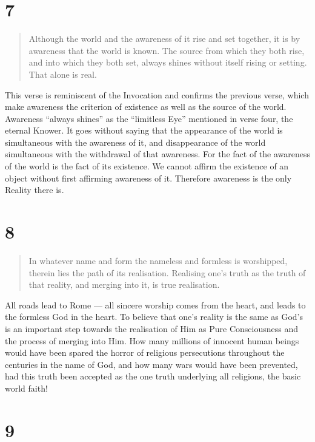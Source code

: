 \documentclass[12pt]{report}
\begin{document}
\section*{7}

\begin{quote}
Although the world and the awareness of it rise and set together, it
is by awareness that the world is known. The source from which they
both rise, and into which they both set, always shines without itself
rising or setting. That alone is real.
\end{quote}


This verse is reminiscent of the Invocation and confirms the previous
verse, which make awareness the criterion of existence as well as the
source of the world. Awareness ``always shines'' as the ``limitless
Eye'' mentioned in verse four, the eternal Knower. It goes without
saying that the appearance of the world is simultaneous with the
awareness of it, and disappearance of the world simultaneous with the
withdrawal of that awareness. For the fact of the awareness of the
world is the fact of its existence. We cannot affirm the existence of
an object without first affirming awareness of it. Therefore awareness
is the only Reality there is.

\section*{8}

\begin{quote}
In whatever name and form the nameless and formless is worshipped,
therein lies the path of its realisation. Realising one's truth as the
truth of that reality, and merging into it, is true realisation.
\end{quote}


All roads lead to Rome --- all sincere worship comes from the heart,
and leads to the formless God in the heart. To believe that one's
reality is the same as God's is an important step towards the
realisation of Him as Pure Consciousness and the process of merging
into Him. How many millions of innocent human beings would have been
spared the horror of religious persecutions throughout the centuries
in the name of God, and how many wars would have been prevented, had
this truth been accepted as the one truth underlying all religions,
the basic world faith!

\section*{9}
\end{document}
